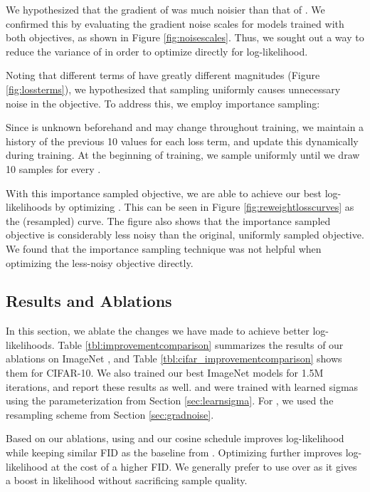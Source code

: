 \documentclass{article}
\begin{document}
We hypothesized that the gradient of  was much noisier than that of . We confirmed this by evaluating the gradient noise scales \citep{gradnoisescale} for models trained with both objectives, as shown in Figure \ref{fig:noisescales}. Thus, we sought out a way to reduce the variance of  in order to optimize directly for log-likelihood.

Noting that different terms of  have greatly different magnitudes (Figure \ref{fig:lossterms}), we hypothesized that sampling  uniformly causes unnecessary noise in the  objective. To address this, we employ importance sampling:

Since  is unknown beforehand and may change throughout training, we maintain a history of the previous 10 values for each loss term, and update this dynamically during training. At the beginning of training, we sample  uniformly until we draw 10 samples for every .

With this importance sampled objective, we are able to achieve our best log-likelihoods by optimizing . This can be seen in Figure \ref{fig:reweightlosscurves} as the  (resampled) curve. The figure also shows that the importance sampled objective is considerably less noisy than the original, uniformly sampled objective. We found that the importance sampling technique was not helpful when optimizing the less-noisy  objective directly.

\subsection{Results and Ablations}
\label{sec:summarizing}

In this section, we ablate the changes we have made to achieve better log-likelihoods. Table \ref{tbl:improvementcomparison} summarizes the results of our ablations on ImageNet , and Table \ref{tbl:cifar_improvementcomparison} shows them for CIFAR-10. We also trained our best ImageNet  models for 1.5M iterations, and report these results as well.  and  were trained with learned sigmas using the parameterization from Section \ref{sec:learnsigma}. For , we used the resampling scheme from Section \ref{sec:gradnoise}.

Based on our ablations, using  and our cosine schedule improves log-likelihood while keeping similar FID as the baseline from \citet{ddpm}. Optimizing  further improves log-likelihood at the cost of a higher FID. We generally prefer to use  over  as it gives a boost in likelihood without sacrificing sample quality. 
\end{document}
